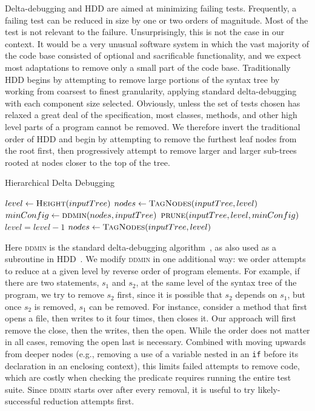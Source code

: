 Delta-debugging and HDD are aimed at minimizing failing tests.  Frequently, a
failing test can be reduced in size by one or two orders of magnitude.  Most of
the test is not relevant to the failure.  Unsurprisingly, this is not the case
in our context.  It would be a very unusual software system in which the vast
majority of the code base consisted of optional and sacrificable functionality,
and we expect most adaptations to remove only a small part of the code base.
Traditionally HDD begins by attempting to remove large portions of the syntax
tree by working from coarsest to finest granularity, applying standard
delta-debugging with each component size selected.  Obviously, unless the set of
tests chosen has relaxed a great deal of the specification, most classes,
methods, and other high level parts of a program cannot be removed.  We
therefore invert the traditional order of HDD and begin by attempting to remove
the furthest leaf nodes from the root first, then progressively attempt to
remove larger and larger sub-trees rooted at nodes closer to the top of the
tree.

\begin{algorithm}
\caption{Hierarchical Delta Debugging}
\hrulefill
\begin{algorithmic}[1]
    \State $level\gets\textsc{Height}(inputTree)$
    \State $nodes\gets\textsc{TagNodes}(inputTree,level)$ 
	\State $minConfig\gets\textsc{ddmin}(nodes,inputTree)$
	\State $\textsc{prune}(inputTree,level,minConfig)$
	\State $level = level - 1$
	\State $nodes\gets\textsc{TagNodes}(inputTree,level)$ 	
	\EndWhile

\EndProcedure
\end{algorithmic}
\label{alg:hdd}
\end{algorithm}

Here \textsc{ddmin} is the standard delta-debugging
algorithm~\cite{zeller2002simplifying}, as also used as a subroutine in
HDD~\cite{misherghi2006hdd}.  We modify \textsc{ddmin} in one additional way:
we order attempts to reduce at a given level by reverse order of program
elements.  For example, if there are two statements, $s_1$ and $s_2$, at the
same level of the syntax tree of the program, we try to remove $s_2$ first,
since it is possible that $s_2$ depends on $s_1$, but once $s_2$ is removed,
$s_1$ can be removed.  For instance, consider a method that first opens a file,
then writes to it four times, then closes it.  Our approach will first remove
the close, then the writes, then the open.  While the order does not matter in
all cases, removing the open last is necessary.  Combined with moving upwards
from deeper nodes (e.g., removing a use of a variable nested in an {\tt if}
before its declaration in an enclosing context), this limits failed attempts to
remove code, which are costly when checking the predicate requires running the
entire test suite.  Since \textsc{ddmin} starts over after every removal, it is
useful to try likely-successful reduction attempts first.

